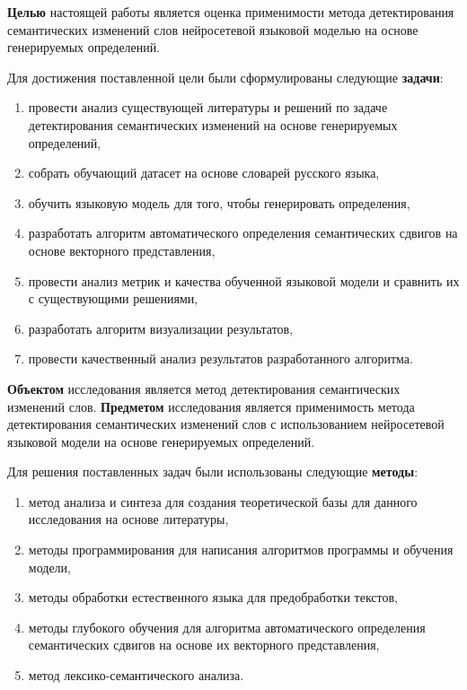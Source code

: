 \documentclass[LI,VKR]{HSEUniversity}
\begin{document}
\textbf{Целью} настоящей работы является оценка применимости метода детектирования семантических
изменений слов нейросетевой языковой моделью на основе генерируемых определений.

Для достижения поставленной цели были сформулированы следующие \textbf{задачи}:
\begin{enumerate}
    \item провести анализ существующей литературы и решений по задаче детектирования семантических
    изменений на основе генерируемых определений,
    \item собрать обучающий датасет на основе словарей русского языка,
    \item обучить языковую модель для того, чтобы генерировать определения,
    \item разработать алгоритм автоматического определения семантических сдвигов на
основе векторного представления,
    \item провести анализ метрик и качества обученной языковой модели и сравнить их с
    существующими решениями,
    \item разработать алгоритм визуализации результатов,
    \item провести качественный анализ результатов разработанного алгоритма.
\end{enumerate}

\textbf{Объектом} исследования является метод детектирования семантических изменений слов.
\textbf{Предметом} исследования является применимость метода детектирования семантических изменений
слов с использованием нейросетевой языковой модели на основе генерируемых определений.

Для решения поставленных задач были использованы следующие \textbf{методы}:
\begin{enumerate}
    \item метод анализа и синтеза для создания теоретической базы для данного исследования
на основе литературы,
    \item методы программирования для написания алгоритмов программы и обучения модели,
    \item методы обработки естественного языка для предобработки текстов,
    \item методы глубокого обучения для алгоритма автоматического определения семантических
сдвигов на основе их векторного представления,
    \item метод лексико-семантического анализа. %
\end{enumerate}
\end{document}
